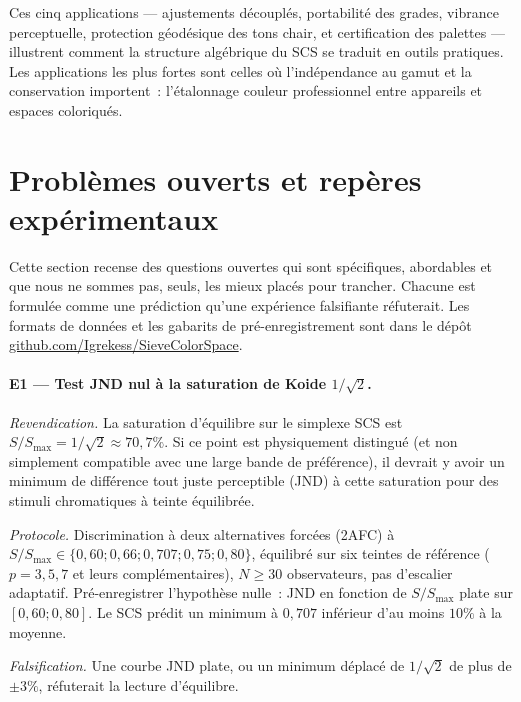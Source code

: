 \documentclass[12pt,a4paper]{article}
\begin{document}
\medskip

Ces cinq applications --- ajustements d\'ecoupl\'es, portabilit\'e
des grades, vibrance perceptuelle, protection g\'eod\'esique des tons
chair, et certification des palettes --- illustrent comment la
structure alg\'ebrique du SCS se traduit en outils pratiques. Les
applications les plus fortes sont celles o\`u l'ind\'ependance au gamut
et la conservation importent~: l'\'etalonnage couleur professionnel
entre appareils et espaces coloriqu\'es.

\section{Probl\`emes ouverts et rep\`eres exp\'erimentaux}
\label{sec:open_problems}

Cette section recense des questions ouvertes qui sont sp\'ecifiques,
abordables et que nous ne sommes pas, seuls, les mieux plac\'es pour
trancher. Chacune est formul\'ee comme une pr\'ediction qu'une
exp\'erience falsifiante r\'efuterait. Les formats de donn\'ees et
les gabarits de pr\'e-enregistrement sont dans le d\'ep\^ot
\href{https://github.com/Igrekess/SieveColorSpace}{github.com/Igrekess/SieveColorSpace}.

\paragraph{E1 --- Test JND nul \`a la saturation de Koide $1/\sqrt{2}$.}
\emph{Revendication.} La saturation d'\'equilibre sur le simplexe
SCS est $S/S_{\max} = 1/\sqrt{2} \approx 70{,}7\%$. Si ce point est
physiquement distingu\'e (et non simplement compatible avec une large
bande de pr\'ef\'erence), il devrait y avoir un minimum de diff\'erence
tout juste perceptible (JND) \`a cette saturation pour des stimuli
chromatiques \`a teinte \'equilibr\'ee.

\emph{Protocole.} Discrimination \`a deux alternatives forc\'ees (2AFC)
\`a $S/S_{\max} \in \{0{,}60; 0{,}66; 0{,}707; 0{,}75; 0{,}80\}$,
\'equilibr\'e sur six teintes de r\'ef\'erence ($p=3, 5, 7$ et leurs
compl\'ementaires), $N \geq 30$ observateurs, pas d'escalier adaptatif.
Pr\'e-enregistrer l'hypoth\`ese nulle~: JND en fonction de
$S/S_{\max}$ plate sur $[0{,}60; 0{,}80]$. Le SCS pr\'edit un minimum
\`a $0{,}707$ inf\'erieur d'au moins $10\%$ \`a la moyenne.

\emph{Falsification.} Une courbe JND plate, ou un minimum d\'eplac\'e
de $1/\sqrt{2}$ de plus de $\pm 3\%$, r\'efuterait la lecture
d'\'equilibre.
\end{document}
